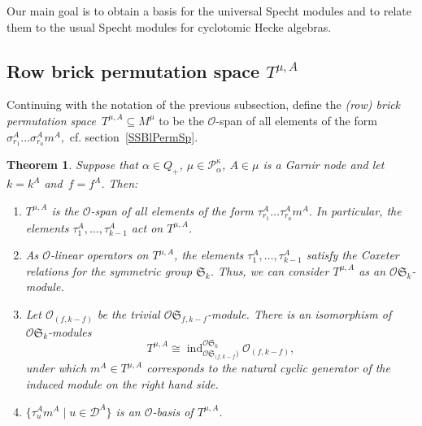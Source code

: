 \documentclass[twoside,11pt,reqno]{amsart}
\numberwithin{equation}{section}
\newtheorem{Theorem}[equation]{Theorem}
\theoremstyle{definition}  %
\newcommand{\ind}{\operatorname{ind}}
\newcommand{\0}{{\bar 0}}
\newcommand{\1}{{\bar 1}}
\newcommand{\al}{\alpha}
\def\Si{\mathfrak{S}}
\newcommand{\si}{\sigma}
\def\triv#1{\O_{#1}}
\newcommand{\D}{{\mathscr D}}
\newcommand\Par[1][]{{\mathscr P}^{\kappa#1}}
\renewcommand\O{\mathcal O}
\begin{document}
Our main goal is to obtain a basis for the universal Specht modules and to relate them to the
usual Specht modules for cyclotomic Hecke algebras. 



\subsection{\boldmath Row brick permutation space $T^{\mu,A}$} \label{SSBrickPerm}
Continuing with the notation of the previous subsection, define the {\em (row) brick permutation space}\, $T^{\mu,A}\subseteq M^\mu$ to be the $\O$-span of all elements of the form 
$
\si_{r_1}^A\dots\si_{r_a}^Am^A,
$
cf. section~\ref{SSBlPermSp}. 


\begin{Theorem} \label{TTauA}%
Suppose that $\al\in Q_+$, $\mu\in\Par_\al$, $A\in\mu$ is a Garnir node and 
let~$k=k^A$ and~$f=f^A$.  Then:
\begin{enumerate}
\item[{\rm (i)}] $T^{\mu,A}$ is the $\O$-span of all elements of the form 
$
\tau_{r_1}^A\dots\tau_{r_a}^Am^A. 
$
In particular, the elements $\tau_1^A,\dots,\tau_{k-1}^A$ act on $T^{\mu,A}$. 
\item[{\rm (ii)}]  As $\O$-linear operators on  $T^{\mu,A}$, the elements $\tau_1^A,\dots,\tau_{k-1}^A$ satisfy the Coxeter relations for the symmetric group $\Si_k$. Thus, we can consider $T^{\mu,A}$ as an $\O\Si_k$-module. 
\item[{\rm (iii)}] Let $\triv{(f,k-f)}$ be the trivial ${\O\Si_{f,k-f}}$-module. There is an isomorphism of $\O\Si_k$-modules 
$$T^{\mu,A}\cong\ind_{\O\Si_{(f,k-f})}^{\O\Si_k}\triv{(f,k-f)},$$ under which $m^A\in T^{\mu,A}$ corresponds to the natural cyclic generator of the induced module on the right hand side. 
\item[{\rm (iv)}] $\{\tau_u^A m^A\mid u\in\D^A\} 
$
is an $\O$-basis of $T^{\mu,A}$. 
\end{enumerate}
\end{Theorem}
\end{document}
